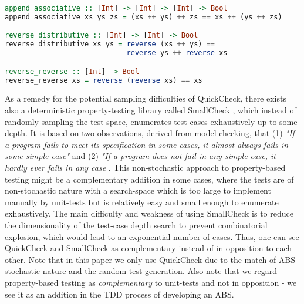 \begin{lstlisting}[language=Haskell, caption={Examples of properties of lists, expressed in Haskell code.}, captionpos=b, label=list_properties]
append_associative :: [Int] -> [Int] -> [Int] -> Bool
append_associative xs ys zs = (xs ++ ys) ++ zs == xs ++ (ys ++ zs)

reverse_distributive :: [Int] -> [Int] -> Bool
reverse_distributive xs ys = reverse (xs ++ ys) == 
                             reverse ys ++ reverse xs

reverse_reverse :: [Int] -> Bool
reverse_reverse xs = reverse (reverse xs) == xs
\end{lstlisting}

%
%
%

As a remedy for the potential sampling difficulties of QuickCheck, there exists also a deterministic property-testing library called SmallCheck \cite{runciman_smallcheck_2008}, which instead of randomly sampling the test-space, enumerates test-cases exhaustively up to some depth. It is based on two observations, derived from model-checking, that (1) \textit{"If a program fails to meet its specification in some cases, it almost always fails in some simple case"} and (2) \textit{"If a program does not fail in any simple case, it hardly ever fails in any case} \cite{runciman_smallcheck_2008}. This non-stochastic approach to property-based testing might be a complementary addition in some cases, where the tests are of non-stochastic nature with a search-space which is too large to implement manually by unit-tests but is relatively easy and small enough to enumerate exhaustively. The main difficulty and weakness of using SmallCheck is to reduce the dimensionality of the test-case depth search to prevent combinatorial explosion, which would lead to an exponential number of cases. Thus, one can see QuickCheck and SmallCheck as complementary instead of in opposition to each other.
Note that in this paper we only use QuickCheck due to the match of ABS stochastic nature and the random test generation. Also note that we regard property-based testing as \textit{complementary} to unit-tests and not in opposition - we see it as an addition in the TDD process of developing an ABS.